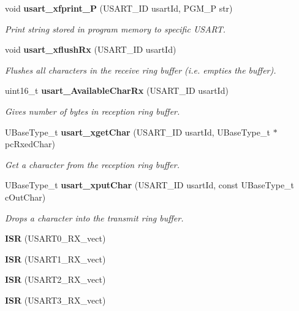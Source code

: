 \begin{DoxyCompactItemize}
void {\bf usart\+\_\+xfprint\+\_\+\+P} (U\+S\+A\+R\+T\+\_\+\+I\+D usart\+Id, P\+G\+M\+\_\+\+P str)
\begin{DoxyCompactList}\small\item\em Print string stored in program memory to specific U\+S\+A\+R\+T. \end{DoxyCompactList}\item 
void {\bf usart\+\_\+xflush\+Rx} (U\+S\+A\+R\+T\+\_\+\+I\+D usart\+Id)
\begin{DoxyCompactList}\small\item\em Flushes all characters in the receive ring buffer (i.\+e. empties the buffer). \end{DoxyCompactList}\item 
uint16\+\_\+t {\bf usart\+\_\+\+Available\+Char\+Rx} (U\+S\+A\+R\+T\+\_\+\+I\+D usart\+Id)
\begin{DoxyCompactList}\small\item\em Gives number of bytes in reception ring buffer. \end{DoxyCompactList}\item 
U\+Base\+Type\+\_\+t {\bf usart\+\_\+xget\+Char} (U\+S\+A\+R\+T\+\_\+\+I\+D usart\+Id, U\+Base\+Type\+\_\+t $\ast$pc\+Rxed\+Char)
\begin{DoxyCompactList}\small\item\em Get a character from the reception ring buffer. \end{DoxyCompactList}\item 
U\+Base\+Type\+\_\+t {\bf usart\+\_\+xput\+Char} (U\+S\+A\+R\+T\+\_\+\+I\+D usart\+Id, const U\+Base\+Type\+\_\+t c\+Out\+Char)
\begin{DoxyCompactList}\small\item\em Drops a character into the transmit ring buffer. \end{DoxyCompactList}\item 
{\bfseries I\+S\+R} (U\+S\+A\+R\+T0\+\_\+\+R\+X\+\_\+vect)\label{group__usart_async_module_ga084f0a9cf05b1877bd8a71a90dae7ff8}

\item 
{\bfseries I\+S\+R} (U\+S\+A\+R\+T1\+\_\+\+R\+X\+\_\+vect)\label{group__usart_async_module_gae6e8a8009a9ae0c59f25a496d1cf5a84}

\item 
{\bfseries I\+S\+R} (U\+S\+A\+R\+T2\+\_\+\+R\+X\+\_\+vect)\label{group__usart_async_module_ga63a86aad9ba2e355fe6380da553f554e}

\item 
{\bfseries I\+S\+R} (U\+S\+A\+R\+T3\+\_\+\+R\+X\+\_\+vect)\label{group__usart_async_module_ga88e32db0cad75219c51253f5c1052fc0}


\end{DoxyCompactItemize}
